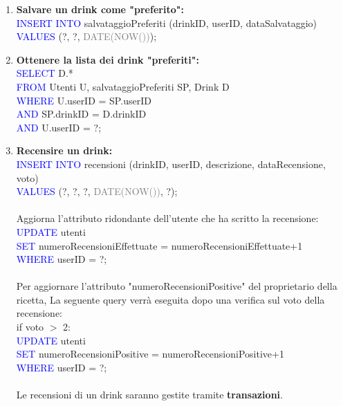 \documentclass[a4paper,12pt]{report}
\begin{document}
\begin{enumerate}
    \item \textbf{Salvare un drink come "preferito":\\}
        \textcolor{blue}{INSERT INTO} salvataggioPreferiti (drinkID, userID, dataSalvataggio)\\
        \textcolor{blue}{VALUES} (?, ?, \textcolor{gray}{DATE(NOW())});
    
    \item \textbf{Ottenere la lista dei drink "preferiti":\\}
        \textcolor{blue}{SELECT} D.*\\
        \textcolor{blue}{FROM} Utenti U, salvataggioPreferiti SP, Drink D\\
        \textcolor{blue}{WHERE} U.userID = SP.userID\\
        \textcolor{blue}{AND} SP.drinkID = D.drinkID\\
        \textcolor{blue}{AND} U.userID = ?;
        
    \item \textbf{Recensire un drink:\\}
        \textcolor{blue}{INSERT INTO} recensioni \footnotesize(drinkID, userID, descrizione, dataRecensione, voto)\\ \normalsize
        \textcolor{blue}{VALUES} (?, ?, ?, \textcolor{gray}{DATE(NOW())}, ?);
        \\\\
        Aggiorna l'attributo ridondante dell'utente che ha scritto la recensione:\\
        \textcolor{blue}{UPDATE} utenti\\
        \textcolor{blue}{SET} numeroRecensioniEffettuate = numeroRecensioniEffettuate+1\\
        \textcolor{blue}{WHERE} userID = ?;
        \\\\
        Per aggiornare l'attributo "numeroRecensioniPositive" del proprietario della ricetta, La seguente query verrà eseguita dopo una verifica sul voto della recensione:\\
        if voto $>$ 2:\\
            \textcolor{blue}{UPDATE} utenti\\
            \textcolor{blue}{SET} numeroRecensioniPositive = numeroRecensioniPositive+1\\
            \textcolor{blue}{WHERE} userID = ?;
        \\\\
        Le recensioni di un drink saranno gestite  tramite \textbf{transazioni}. 


\end{enumerate}
\end{document}

